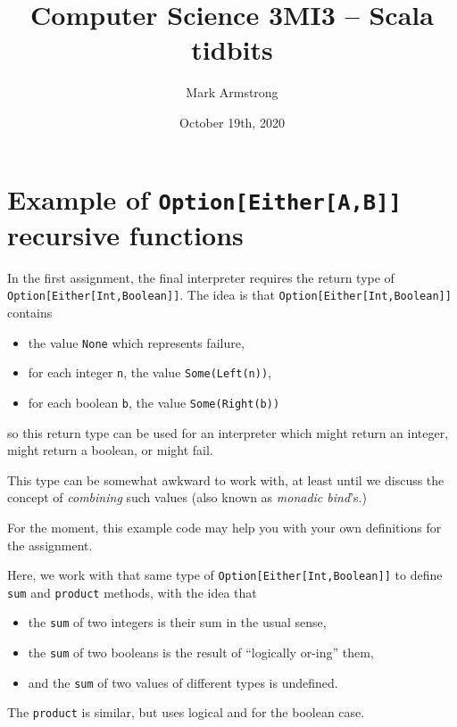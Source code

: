 \documentclass[11pt]{article}
\author{Mark Armstrong}
\date{October 19th, 2020}
\title{Computer Science 3MI3 – Scala tidbits}
\begin{document}
\maketitle
\tableofcontents


\section*{Example of \texttt{Option[Either[A,B]]} recursive functions}
\label{sec:org76f710d}
In the first assignment, the final interpreter requires
the return type of \texttt{Option[Either[Int,Boolean]]}.
The idea is that \texttt{Option[Either[Int,Boolean]]} contains
\begin{itemize}
\item the value \texttt{None} which represents failure,
\item for each integer \texttt{n}, the value \texttt{Some(Left(n))},
\item for each boolean \texttt{b}, the value \texttt{Some(Right(b))}
\end{itemize}
so this return type can be used for an interpreter
which might return an integer, might return a boolean, or
might fail.

This type can be somewhat awkward to work with,
at least until we discuss the concept of \emph{combining} such values
(also known as \emph{monadic bind}'s.)

For the moment, this example code may help you with
your own definitions for the assignment.

Here, we work with that same type of \texttt{Option[Either[Int,Boolean]]} to
define \texttt{sum} and \texttt{product} methods, with the idea that
\begin{itemize}
\item the \texttt{sum} of two integers is their sum in the usual sense,
\item the \texttt{sum} of two booleans is the result of “logically or-ing” them,
\item and the \texttt{sum} of two values of different types is undefined.
\end{itemize}
The \texttt{product} is similar, but uses logical and for the boolean case.
\end{document}

